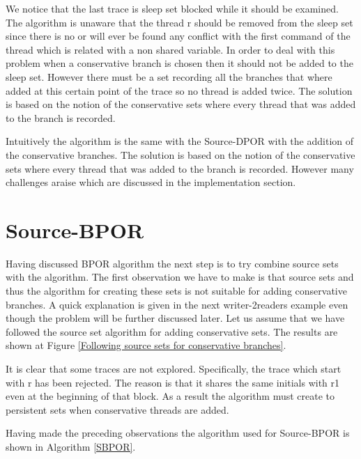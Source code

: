 
We notice that the last trace is sleep set blocked while it should be examined. The algorithm is unaware that the thread r should be removed from the sleep set since there is no
or will ever be found any conflict with the first command of the thread which is related with a non shared variable. In order to deal with this problem when a conservative
branch is chosen then it should not be added to the sleep set. However there must be a set recording all the branches that where added at this certain point of the trace
so no thread is added twice. The solution is based on the notion of the conservative sets where every thread that was added to the branch is recorded. 

Intuitively the algorithm is the same with the Source-DPOR with the addition of the conservative branches. The solution is based on the notion of the conservative sets where every thread that was added to the branch is recorded.  However many challenges araise which are discussed 
in the implementation section.


\section{Source-BPOR}

Having discussed BPOR algorithm the next step is to try combine source sets with the algorithm. The first observation we have to make is that
source sets and thus the algorithm for creating these sets is not suitable for adding conservative branches. A quick explanation is given in the next writer-2readers example
even though the problem will be further discussed later. Let us assume that we have followed the source set algorithm for adding conservative sets. 
The results are shown at Figure \ref{Following source sets for conservative branches}.


It is clear that some traces are not explored. Specifically, the trace which start with r has been rejected. The reason is that it shares the same initials with r1 even at the
beginning of that block. As a result the algorithm must create to persistent sets when conservative threads are added. 

Having made the preceding observations the algorithm used for Source-BPOR is shown in Algorithm \ref{SBPOR}.

